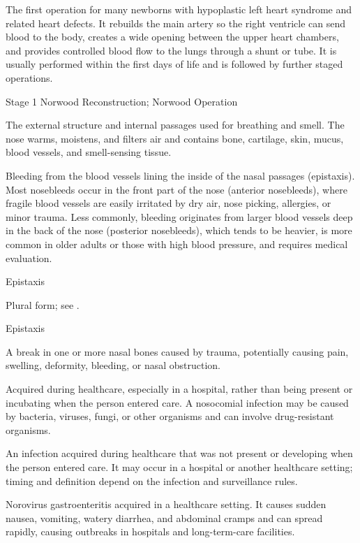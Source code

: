  The first operation for many newborns with hypoplastic left heart syndrome and related heart defects. It rebuilds the main artery so the right ventricle can send blood to the body, creates a wide opening between the upper heart chambers, and provides controlled blood flow to the lungs through a shunt or tube. It is usually performed within the first days of life and is followed by further staged operations.

\synonyms
Stage 1 Norwood Reconstruction; Norwood Operation

 The external structure and internal passages used for breathing and smell. The nose warms, moistens, and filters air and contains bone, cartilage, skin, mucus, blood vessels, and smell-sensing tissue.

 Bleeding from the blood vessels lining the inside of the nasal passages (epistaxis). Most nosebleeds occur in the front part of the nose (anterior nosebleeds), where fragile blood vessels are easily irritated by dry air, nose picking, allergies, or minor trauma. Less commonly, bleeding originates from larger blood vessels deep in the back of the nose (posterior nosebleeds), which tends to be heavier, is more common in older adults or those with high blood pressure, and requires medical evaluation.

\synonyms
Epistaxis

 Plural form; see .

\synonyms
Epistaxis

 A break in one or more nasal bones caused by trauma, potentially causing pain, swelling, deformity, bleeding, or nasal obstruction.

 Acquired during healthcare, especially in a hospital, rather than being present or incubating when the person entered care. A nosocomial infection may be caused by bacteria, viruses, fungi, or other organisms and can involve drug-resistant organisms.

 An infection acquired during healthcare that was not present or developing when the person entered care. It may occur in a hospital or another healthcare setting; timing and definition depend on the infection and surveillance rules.

 Norovirus gastroenteritis acquired in a healthcare setting. It causes sudden nausea, vomiting, watery diarrhea, and abdominal cramps and can spread rapidly, causing outbreaks in hospitals and long-term-care facilities.

